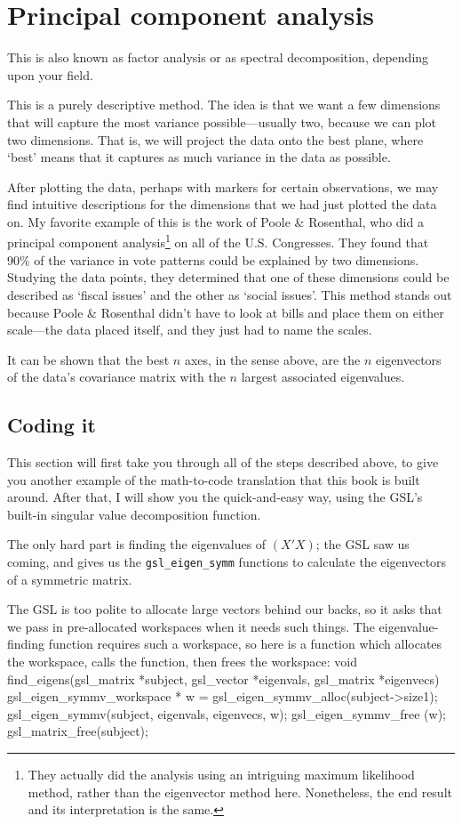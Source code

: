 \section{Principal component analysis} This is also known as factor
analysis or as spectral decomposition, depending upon your field. 

This is a purely descriptive method.  The idea is that we want a few
dimensions that will capture the most variance possible---usually two,
because we can plot two dimensions. That is, we will project the data
onto the best plane, where `best' means that it captures as much
variance in the data as possible.

After plotting the data, perhaps with markers for certain observations,
we may find intuitive descriptions for the dimensions that we had just plotted the
data on. My favorite example of this is the work of Poole \& Rosenthal,
who did a principal component analysis\footnote{They actually did
the analysis using an intriguing maximum likelihood method, rather
than the eigenvector method here. Nonetheless, the end result and its
interpretation is the same.} on all of the U.S. Congresses. They found
that 90\% of the variance in vote patterns could be explained by two dimensions.
Studying the data points, they determined that one of these dimensions could be
described as `fiscal issues' and the other as `social issues'. This method stands
out because Poole \& Rosenthal didn't have to look at bills and place them on
either scale---the data placed itself, and they just had to name the scales.


It can be shown that the best $n$ axes, in the sense above, are the
$n$ eigenvectors of the data's covariance matrix with the $n$ largest
associated eigenvalues.

\subsection{Coding it}
This section will first take you through all of the steps described above, to give you another example
of the math-to-code translation that this book is built around. After that, I will show you the quick-and-easy
way, using the GSL's built-in singular value decomposition function.

The only hard part is finding the eigenvalues of
$(X'X)$; the GSL saw us coming, and gives us the {\tt gsl\_eigen\_symm} functions
to calculate the eigenvectors of a symmetric matrix.

The GSL is too polite to allocate large vectors behind our backs, so
it asks that we pass in pre-allocated workspaces when it needs such
things. The eigenvalue-finding function requires such a workspace, so
here is a function which allocates the workspace, calls the function,
then frees the workspace:
void find_eigens(gsl_matrix *subject, gsl_vector *eigenvals, 
                            gsl_matrix *eigenvecs){
   gsl_eigen_symmv_workspace * w 
                        = gsl_eigen_symmv_alloc(subject->size1);
   gsl_eigen_symmv(subject, eigenvals, eigenvecs, w);
   gsl_eigen_symmv_free (w);
   gsl_matrix_free(subject);
}

